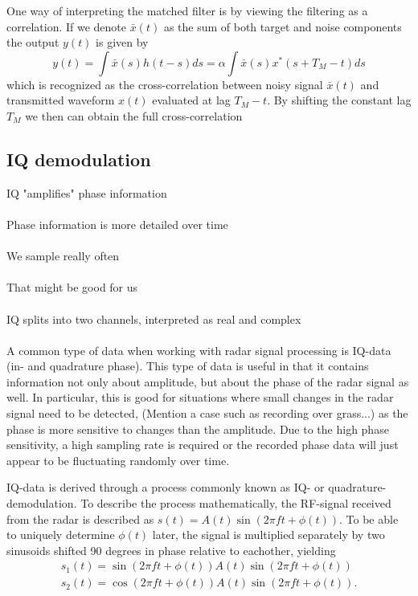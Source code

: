 \documentclass[a4paper, 12pt]{article}
\begin{document}
One way of interpreting the matched filter is by viewing the filtering as a correlation. If we denote $\bar{x}(t)$ as the sum of both target and noise components the output $y(t)$ is given by
%
\begin{equation}
	y(t) = \int \bar{x}(s)h(t-s)ds = \alpha\int \bar{x}(s)x^*(s + T_M - t)ds
\end{equation}
%
which is recognized as the cross-correlation between noisy signal $\bar	{x}(t)$ and transmitted waveform $x(t)$ evaluated at lag $T_M-t$. By shifting the constant lag $T_M$ we then can obtain the full cross-correlation 


\subsection{IQ demodulation}

IQ "amplifies" phase information
\\ \\
Phase information is more detailed over time
\\  \\
We sample really often
\\ \\
That might be good for us
\\ \\
IQ splits into two channels, interpreted as real and complex
\\ \\





A common type of data when working with radar signal processing is IQ-data (in- and quadrature phase).  This type of data is useful in that it contains information not only about amplitude, but about the phase of the radar signal as well. In particular, this is good for situations where small changes in the radar signal need to be detected, (Mention a case such as recording over grass...) as the phase is more sensitive to changes than the amplitude. Due to the high phase sensitivity, a high sampling rate is required or the recorded phase data will just appear to be fluctuating randomly over time.

IQ-data is derived through a process commonly known as IQ- or quadrature-demodulation. To describe the process mathematically,  the RF-signal received from the radar is described as $s(t) = A(t)\sin(2\pi ft+\phi(t))$. To be able to uniquely determine $\phi(t)$ later, the signal is multiplied separately by two sinusoids shifted 90 degrees in phase relative to eachother, yielding
\begin{gather}
	s_1(t) = \sin(2\pi ft+\phi(t))A(t)\sin(2\pi ft+\phi(t)) \\
	s_2(t) = \cos(2\pi ft+\phi(t))A(t)\sin(2\pi ft+\phi(t)).
\end{gather}
\end{document}
